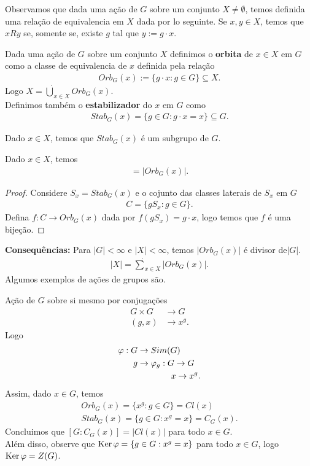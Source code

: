 Observamos que dada uma ação de $G$ sobre um conjunto $X\neq \emptyset$, temos definida uma relação de equivalencia em $X$ dada por lo seguinte. Se $x,y\in X$, temos que $xRy$ se, somente se, existe $g$ tal que $y:=g\cdot x$.
\begin{definition}
  Dada uma ação de $G$ sobre um conjunto $X$ definimos o \textbf{orbita} de $x\in X$ em $G$ como a classe de equivalencia de $x$ definida pela relação
  \begin{align*}
    Orb_{G}(x):=\{g\cdot x:g\in G\}\subseteq X.
  \end{align*}
  Logo $X=\dot\bigcup_{x\in X}Orb_{G}(x)$.\\
  Definimos também o \textbf{estabilizador} do $x$ em $G$ como
  \begin{align*}
    Stab_{G}(x)=\{g\in G:g\cdot x=x\}\subseteq G.
  \end{align*}
\end{definition}
\begin{lemma}
  Dado $x\in X$, temos que $Stab_{G}(x)$ é um subgrupo de $G$.
\end{lemma}
\begin{theorem}
  Dado $x\in X$, temos
  \begin{align*}
    [G:Stab_{G}(x)]=|Orb_{G}(x)|.
  \end{align*}
\end{theorem}
\begin{proof} 
  Considere $S_x=Stab_{G}(x)$ e o cojunto das classes laterais de $S_x$ em $G$
  \begin{align*}
    C=\{gS_x:g\in G\}.
  \end{align*}
  Defina $f:C\to Orb_{G}(x)$ dada por $f(gS_x)=g\cdot x$, logo temos que $f$ é uma bijeção. 
\end{proof}
\textbf{Consequências:}
Para $|G|<\infty$ e $|X|<\infty$, temos $|Orb_{G}(x)|$ é divisor de$|G|$.
\begin{align*}
  |X|=\dot\sum_{x\in X}|Orb_{G}(x)|.
\end{align*}
Algumos exemplos de ações de grupos são.
\begin{example}
  Ação de $G$ sobre si mesmo por conjugações
  \begin{align*}
    G\times G&\to G\\
    (g,x)&\to x^{g}.
  \end{align*}
  Logo
  \begin{align*}
    \varphi: G&\to Sim(G)\\
    g&\to \varphi_g:G\to G\\
    \phantom{g}&\phantom{\to \varphi_g:}\hspace{0.34cm}x\to x^{g}.    
  \end{align*}
  Assim, dado $x\in G$, temos
  \begin{align*}
    Orb_{G}(x)=\{x^{g}:g\in G\}=Cl(x)\\
    Stab_{G}(x)=\{g\in G:x^{g}=x\}=C_{G}(x).
  \end{align*}
  Concluimos que $[G:C_{G}(x)]=|Cl(x)|$ para todo $x\in G$.\\
  Além disso, observe que $\operatorname{Ker}\varphi=\{g\in G:x^{g}=x\}$ para todo $x\in G$, logo $\operatorname{Ker}\varphi=Z(G)$. 
\end{example}
